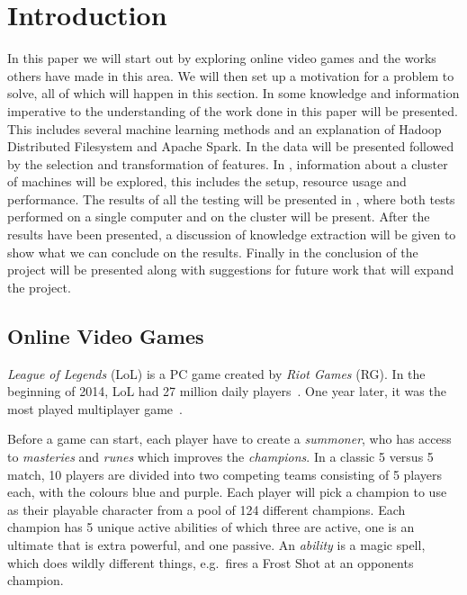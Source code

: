 \section{Introduction}\label{sec:intro}
In this paper we will start out by exploring online video games and the works others have made in this area. We will then set up a motivation for a problem to solve, all of which will happen in this section. In  some knowledge and information imperative to the understanding of the work done in this paper will be presented. This includes several machine learning methods and an explanation of Hadoop Distributed Filesystem and Apache Spark. In  the data will be presented followed by the selection and transformation of features. In , information about a cluster of machines will be explored, this includes the setup, resource usage and performance. The results of all the testing will be presented in , where both tests performed on a single computer and on the cluster will be present. After the results have been presented, a discussion of knowledge extraction will be given to show what we can conclude on the results. Finally in  the conclusion of the project will be presented along with suggestions for future work that will expand the project.  

\subsection{Online Video Games}\label{sec:onlinevideogames}

\emph{League of Legends} (LoL) is a PC game created by \emph{Riot Games} (RG). In the beginning of 2014, LoL had 27 million daily players~\cite{LoL27mill}. One year later, it was the most played multiplayer game~\cite{LoLmostplayed}.

Before a game can start, each player have to create a \emph{summoner}, who has access to \emph{masteries} and \emph{runes} which improves the \emph{champions}. In a classic 5 versus 5 match, 10 players are divided into two competing teams consisting of 5 players each, with the colours blue and purple. Each player will pick a champion to use as their playable character from a pool of 124 different champions. Each champion has 5 unique active abilities of which three are active, one is an ultimate that is extra powerful, and one passive. An \emph{ability} is a magic spell, which does wildly different things, e.g.\ fires a Frost Shot at an opponents champion. 

